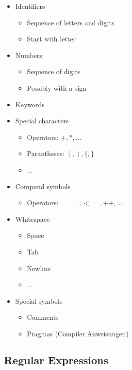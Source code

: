 \documentclass{scrartcl}
\begin{document}
\begin{itemize}
	\item Identifiers
	\begin{itemize}
		\item Sequence of letters and digits
		\item Start with letter
	\end{itemize}
	\item Numbers
	\begin{itemize}
		\item Sequence of digits
		\item Possibly with a sign
	\end{itemize}
	\item Keywords
	\item Special characters
	\begin{itemize}
		\item Operators: $ +,*,\ldots $
		\item Parantheses: $ (,),\{,\} $
		\item $ \ldots $
	\end{itemize}
	\item Compund symbols
	\begin{itemize}
		\item Operators: $ ==,<=,++,\ldots $
	\end{itemize}
	\item Whitespace
	\begin{itemize}
		\item Space
		\item Tab
		\item Newline
		\item $ \ldots $
	\end{itemize}
	\item Special symbols
	\begin{itemize}
		\item Comments
		\item Pragmas (Compiler Anweisungen)
	\end{itemize}
\end{itemize}

\subsection{Regular Expressions}
\end{document}
